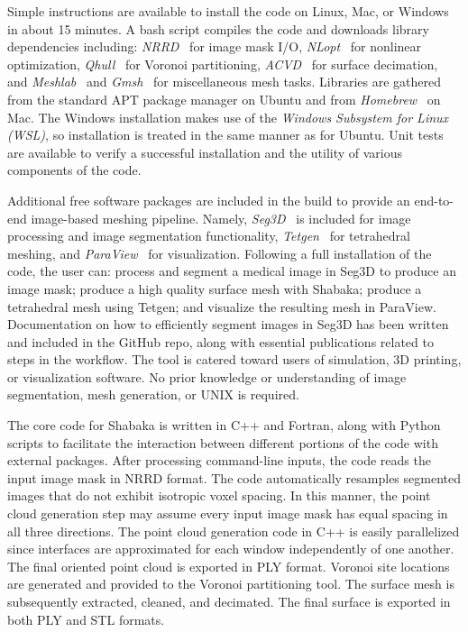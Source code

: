 Simple instructions are available to install the code on Linux, Mac, or Windows in about 15 minutes. A bash script compiles the code and downloads library dependencies including: \textit{NRRD}~\cite{nrrd} for image mask I/O, \textit{NLopt}~\cite{nlo} for nonlinear optimization, \textit{Qhull}~\cite{barber_1996} for Voronoi partitioning, \textit{ACVD}~\cite{valette_2004} for surface decimation, and \textit{Meshlab}~\cite{meshlab} and \textit{Gmsh}~\cite{geuzaine_2009} for miscellaneous mesh tasks. Libraries are gathered from the standard APT package manager on Ubuntu and from \textit{Homebrew}~\cite{brew} on Mac. The Windows installation makes use of the \textit{Windows Subsystem for Linux (WSL)}, so installation is treated in the same manner as for Ubuntu. Unit tests are available to verify a successful installation and the utility of various components of the code.

Additional free software packages are included in the build to provide an end-to-end image-based meshing pipeline. Namely, \textit{Seg3D}~\cite{Seg3D} is included for image processing and image segmentation functionality, \textit{Tetgen}~\cite{tetgen} for tetrahedral meshing, and \textit{ParaView}~\cite{paraview} for visualization. Following a full installation of the code, the user can: process and segment a medical image in Seg3D to produce an image mask; produce a high quality surface mesh with Shabaka; produce a tetrahedral mesh using Tetgen; and visualize the resulting mesh in ParaView. Documentation on how to efficiently segment images in Seg3D has been written and included in the GitHub repo, along with essential publications related to steps in the workflow. The tool is catered toward users of simulation, 3D printing, or visualization software. No prior knowledge or understanding of image segmentation, mesh generation, or UNIX is required.

The core code for Shabaka is written in C++ and Fortran, along with Python scripts to facilitate the interaction between different portions of the code with external packages. After processing command-line inputs, the code reads the input image mask in NRRD format. The code automatically resamples segmented images that do not exhibit isotropic voxel spacing. In this manner, the point cloud generation step may assume every input image mask has equal spacing in all three directions. The point cloud generation code in C++ is easily parallelized since interfaces are approximated for each window independently of one another. The final oriented point cloud is exported in PLY format. Voronoi site locations are generated and provided to the Voronoi partitioning tool. The surface mesh is subsequently extracted, cleaned, and decimated. The final surface is exported in both PLY and STL formats.

